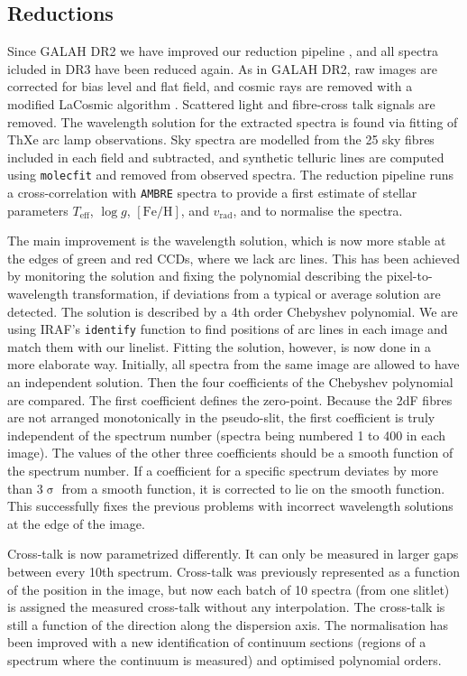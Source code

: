 \documentclass[fleqn,usenatbib,useAMS]{mnras}
\newcommand{\Teff}{$T_\mathrm{eff}$\xspace}
\newcommand{\logg}{$\log g$\xspace}
\newcommand{\feh}{$\mathrm{[Fe/H]}$\xspace}
\newcommand{\vrad}{$v_\mathrm{rad}$\xspace}
\begin{document}
\subsection{Reductions}\label{sec:reductions}

Since GALAH DR2 we have improved our reduction pipeline \citet{Kos2017}, and all spectra icluded in DR3 have been reduced again. As in GALAH DR2, raw images are corrected for bias level and flat field, and cosmic rays are removed with a modified LaCosmic algorithm \citet{vandokkum2001}. Scattered light and fibre-cross talk signals are removed. The wavelength solution for the extracted spectra is found via fitting of ThXe arc lamp observations. Sky spectra are modelled from the 25 sky fibres included in each field and subtracted, and synthetic telluric lines are computed using \texttt{molecfit} \citep{Kausch2015, Smette2015} and removed from observed spectra. The reduction pipeline runs a cross-correlation with \texttt{AMBRE} spectra \citep{DeLaverny2012} to provide a first estimate of stellar parameters \Teff, \logg, \feh, and \vrad,   and to normalise the spectra.

The main improvement is the wavelength solution, which is now more stable at the edges of green and red CCDs, where we lack arc lines. This has been achieved by monitoring the solution and fixing the polynomial describing the pixel-to-wavelength transformation, if deviations from a typical or average solution are detected. The solution is described by a 4th order Chebyshev polynomial. We are using \textsc{IRAF}'s \texttt{identify} function to find positions of arc lines in each image and match them with our linelist. Fitting the solution, however, is now done in a more elaborate way. Initially, all spectra from the same image are allowed to have an independent solution. Then the four coefficients of the Chebyshev polynomial are compared. The first coefficient defines the zero-point. Because the 2dF fibres are not arranged monotonically in the pseudo-slit, the first coefficient is truly independent of the spectrum number (spectra being numbered 1 to 400 in each image). The values of the other three coefficients should be a smooth function of the spectrum number. If a coefficient for a specific spectrum deviates by more than $3\upsigma$ from a smooth function, it is corrected to lie on the smooth function. This successfully fixes the previous problems with incorrect wavelength solutions at the edge of the image. 

Cross-talk is now parametrized differently. It can only be measured in larger gaps between every 10th spectrum. Cross-talk was previously represented as a function of the position in the image, but now each batch of 10 spectra (from one slitlet) is assigned the measured cross-talk without any interpolation. The cross-talk is still a function of the direction along the dispersion axis. The normalisation has been improved with a new identification of continuum sections (regions of a spectrum where the continuum is measured) and optimised polynomial orders. 
\end{document}
